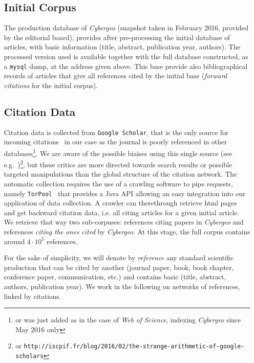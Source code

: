 \subsection*{Initial Corpus}

The production database of \textit{Cybergeo} (snapshot taken in February 2016, provided by the editorial board), provides after pre-processing the initial database of articles, with basic information (title, abstract, publication year, authors). The processed version used is available together with the full database constructed, as a \texttt{mysql} dump, at the address given above. This base provide also bibliographical records of articles that give all references cited by the initial base (\emph{forward citations} for the initial corpus).



\subsection*{Citation Data}

Citation data is collected from \texttt{Google Scholar}, that is the only source for incoming citations~\citep{noruzi2005google} in our case as the journal is poorly referenced in other databases\footnote{or was just added as in the case of \textit{Web of Science}, indexing \textit{Cybergeo} since May 2016 only}. We are aware of the possible biaises using this single source (see e.g.~\cite{bohannon2014scientific})\footnote{or \texttt{http://iscpif.fr/blog/2016/02/the-strange-arithmetic-of-google-scholars}}, but these critics are more directed towards search results or possible targeted manipulations than the global structure of the citation network. The automatic collection requires the use of a crawling software to pipe requests, namely \texttt{TorPool}~\citep{torpool} that provides a Java API allowing an easy integration into our application of data collection. A crawler can therethrough retrieve html pages and get backward citation data, i.e. all citing articles for a given initial article. We retrieve that way two sub-corpuses: references citing papers in \textit{Cybergeo} and references \emph{citing the ones cited} by \textit{Cybergeo}. At this stage, the full corpus contains around $4\cdot10^5$ references.


For the sake of simplicity, we will denote by \emph{reference} any standard scientific production that can be cited by another (journal paper, book, book chapter, conference paper, communication, etc.) and contains basic  (title, abstract, authors, publication year). We work in the following on networks of references, linked by citations.



